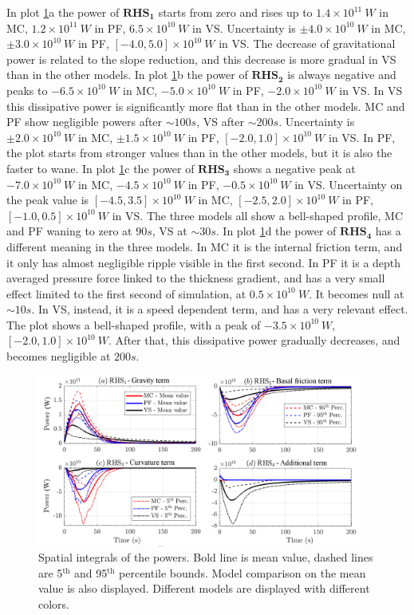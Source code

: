 \documentclass{article}
\begin{document}
In plot \ref{fig:Colima-Power-spatial}a the power of $\boldsymbol{RHS_1}$ starts from zero and rises up to $1.4\times 10^{11}\ W$ in MC, $1.2\times 10^{11}\ W$ in PF, $6.5\times 10^{10}\ W$ in VS. Uncertainty is $\pm 4.0\times 10^{10}\ W$ in MC, $\pm 3.0\times 10^{10}\ W$ in PF, $[-4.0,5.0]\times 10^{10}\ W$ in VS. The decrease of gravitational power is related to the slope reduction, and this decrease is more gradual in VS than in the other models. In plot \ref{fig:Colima-Power-spatial}b the power of  $\boldsymbol{RHS_2}$ is always negative and peaks to $-6.5\times 10^{10}\ W$ in MC, $-5.0\times 10^{10}\ W$ in PF, $-2.0\times 10^{10}\ W$ in VS. In VS this dissipative power is significantly more flat than in the other models. MC and PF show negligible powers after $\sim 100 s$, VS after $\sim 200 s$. Uncertainty is $\pm 2.0\times 10^{10}\ W$ in MC, $\pm 1.5\times 10^{10}\ W$ in PF, $[-2.0,1.0]\times 10^{10}\ W$ in VS. In PF, the plot starts from stronger values than in the other models, but it is also the faster to wane. In plot \ref{fig:Colima-Power-spatial}c the power of $\boldsymbol{RHS_3}$ shows a negative peak at $-7.0\times 10^{10}\ W$ in MC, $-4.5\times 10^{10}\ W$ in PF, $-0.5\times 10^{10}\ W$ in VS. Uncertainty on the peak value is $[-4.5,3.5]\times 10^{10}\ W$ in MC, $[-2.5,2.0]\times 10^{10}\ W$ in PF, $[-1.0,0.5]\times 10^{10}\ W$ in VS. The three models all show a bell-shaped profile, MC and PF waning to zero at $90 s$, VS at $\sim 30 s$. In plot \ref{fig:Colima-Power-spatial}d the power of $\boldsymbol{RHS_4}$ has a different meaning in the three models. In MC it is the internal friction term, and it only has almost negligible ripple visible in the first second. In PF it is a depth averaged pressure force linked to the thickness gradient, and has a very small effect limited to the first second of simulation, at $0.5\times 10^{10}\ W$. It becomes null at $\sim 10 s$. In VS, instead, it is a speed dependent term, and has a very relevant effect. The plot shows a bell-shaped profile, with a peak of $-3.5\times 10^{10}\ W$, $[-2.0,1.0]\times 10^{10}\ W$. After that, this dissipative power gradually decreases, and becomes negligible at $200 s$.
\begin{figure}[H]
        \centering
        \includegraphics[width=0.95\textwidth]{PowersColima.png}
        \caption{Spatial integrals of the powers. Bold line is mean value, dashed lines are 5$^{\mathrm{th}}$ and 95$^{\mathrm{th}}$ percentile bounds. Model comparison on the mean value is also displayed. Different models are displayed with different colors.}
        \label{fig:Colima-Power-spatial}
\end{figure}
\end{document}
